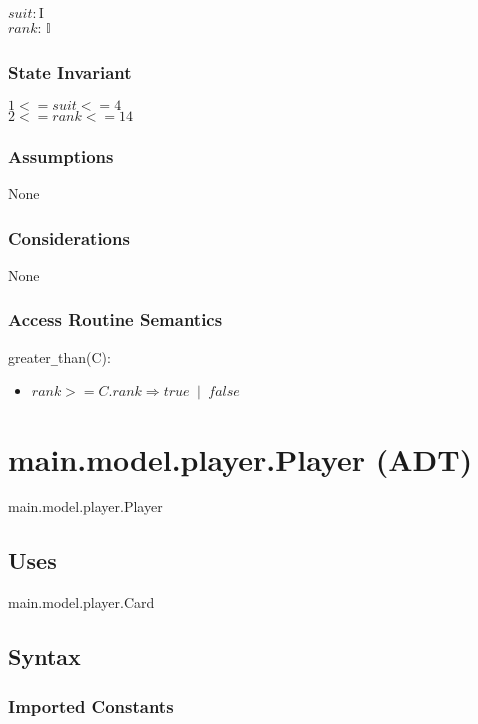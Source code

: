 \documentclass[12pt, titlepage]{article}
\begin{document}
$\mathit{suit}: \text{I}$\\
$\mathit{rank}$: $\mathbb{I}$

\subsubsection* {State Invariant}

$1 <= \mathit{suit} <= 4$\\
$2 <= \mathit{rank} <= 14$

\subsubsection* {Assumptions}

None

\subsubsection* {Considerations}

None

\subsubsection* {Access Routine Semantics}

\noindent greater\verb|_|than(C):
\begin{itemize}
\item $rank >= C.rank \Longrightarrow true \phantom{a}|\phantom{a} false$ 

\end{itemize}

\section* {main.model.player.Player (ADT)}

main.model.player.Player

\subsection* {Uses}

main.model.player.Card

\subsection* {Syntax}

\subsubsection* {Imported Constants}
\end{document}
